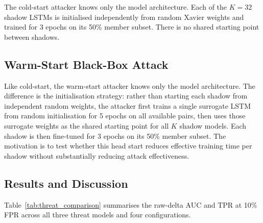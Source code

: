 The cold-start attacker knows only the model architecture. Each of the $K = 32$ shadow LSTMs is initialised independently from random Xavier weights and trained for 3 epochs on its 50\% member subset. There is no shared starting point between shadows.

\subsection{Warm-Start Black-Box Attack}
\label{ssec:mia_warm}

Like cold-start, the warm-start attacker knows only the model architecture. The difference is the initialisation strategy: rather than starting each shadow from independent random weights, the attacker first trains a single surrogate LSTM from random initialisation for 5 epochs on all available pairs, then uses those surrogate weights as the shared starting point for all $K$ shadow models. Each shadow is then fine-tuned for 3 epochs on its 50\% member subset. The motivation is to test whether this head start reduces effective training time per shadow without substantially reducing attack effectiveness.

\subsection{Results and Discussion}
\label{ssec:mia_threat_results}

Table~\ref{tab:threat_comparison} summarises the raw-delta AUC and TPR at 10\% FPR across all three threat models and four configurations.

